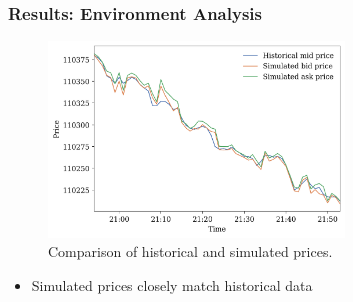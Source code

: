 \documentclass{beamer}
\begin{document}
\begin{frame}
  \frametitle{Results: Environment Analysis}

  \begin{figure}
    \centering
    \includegraphics[width=0.7\textwidth]{figures/hist_vs_sim_prices.png}
    \caption{Comparison of historical and simulated prices.}
  \end{figure}

  \begin{itemize}
    \item Simulated prices closely match historical data
  \end{itemize}

\end{frame}
\end{document}
